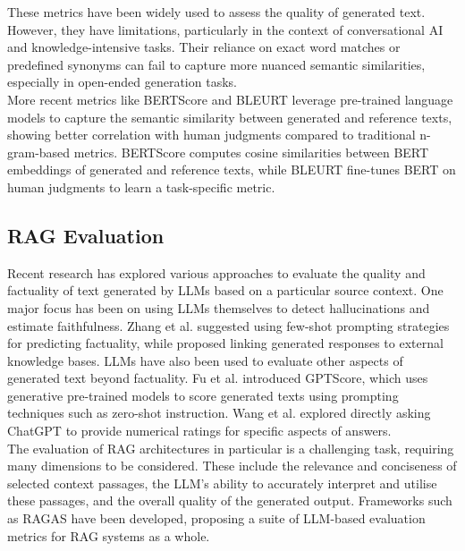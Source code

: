 These metrics have been widely used to assess the quality of generated text. However, they have limitations, particularly in the context of conversational AI and knowledge-intensive tasks. Their reliance on exact word matches or predefined synonyms can fail to capture more nuanced semantic similarities, especially in open-ended generation tasks.\\

More recent metrics like BERTScore \cite{zhang2019bertscore} and BLEURT \cite{sellam2020bleurt} leverage pre-trained language models to capture the semantic similarity between generated and reference texts, showing better correlation with human judgments compared to traditional n-gram-based metrics. BERTScore computes cosine similarities between BERT embeddings of generated and reference texts, while BLEURT fine-tunes BERT on human judgments to learn a task-specific metric. 

\subsection{RAG Evaluation}

Recent research has explored various approaches to evaluate the quality and factuality of text generated by LLMs based on a particular source context. One major focus has been on using LLMs themselves to detect hallucinations and estimate faithfulness. Zhang et al. \cite{zhang2023interpretable} suggested using few-shot prompting strategies for predicting factuality, while \cite{min2023factscore} proposed linking generated responses to external knowledge bases. LLMs have also been used to evaluate other aspects of generated text beyond factuality. Fu et al. \cite{fu2023gptscore} introduced GPTScore, which uses generative pre-trained models to score generated texts using prompting techniques such as zero-shot instruction. Wang et al. \cite{wang2023chatgpt} explored directly asking ChatGPT to provide numerical ratings for specific aspects of answers. \\

The evaluation of RAG architectures in particular is a challenging task, requiring many dimensions to be considered. These include the relevance and conciseness of selected context passages, the LLM's ability to accurately interpret and utilise these passages, and the overall quality of the generated output. Frameworks such as RAGAS \cite{es2023ragas} have been developed, proposing a suite of LLM-based evaluation metrics for RAG systems as a whole. \\

